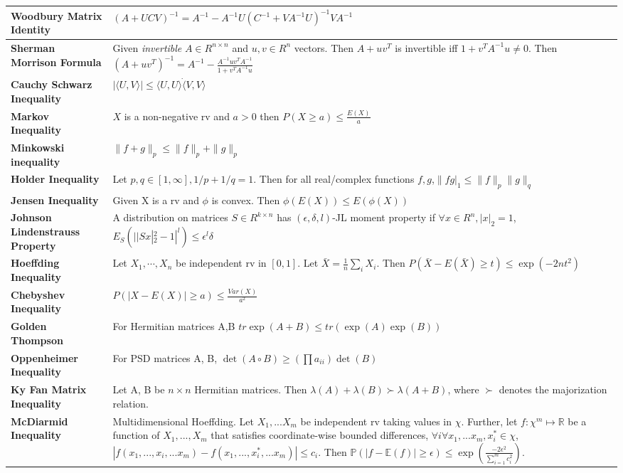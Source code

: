 \documentclass[11pt]{article}
\begin{document}
\begin{longtable}{|>{\raggedright}m{4.5cm}|m{13cm}|} \hline
\textbf{Woodbury Matrix Identity} & $(A+UCV)^{-1} = A^{-1} - A^{-1}U(C^{-1}+VA^{-1}U)^{-1}VA^{-1}$\\ \hline
\textbf{Sherman Morrison Formula} & Given \textit{invertible} $A \in R^{n\times n}$ and $u,v\in R^n$ vectors. Then $A+uv^T$ is invertible iff $1+v^TA^{-1}u \neq 0$. Then $(A+uv^T)^{-1} = A^{-1}-\frac{A^{-1}uv^TA^{-1}}{1+v^TA^{-1}u}$\\ \hline
\textbf{Cauchy Schwarz Inequality} & $ |\langle U, V \rangle| \leq \langle U, U\rangle \dot \langle V, V\rangle $\\ \hline
\textbf{Markov Inequality} & $X$ is a non-negative rv and $a>0$ then $P(X \geq a) \leq \frac{E(X)}{a}$\\ \hline
\textbf{Minkowski inequality} & $\|f+g\|_p \leq \|f\|_p + \| g\|_p$\\ \hline
\textbf{Holder Inequality} & Let $p,q\in [1, \infty], 1/p+1/q=1$. Then for all real/complex functions $f,g$,$\|fg|_1 \leq \|f\|_p\|g\|_q$\\ \hline
\textbf{Jensen Inequality} & Given X is a rv and $\phi$ is convex. Then $\phi(E(X)) \leq E(\phi(X))$\\ \hline
\textbf{Johnson Lindenstrauss Property} & A distribution on matrices $S\in R^{k \times n}$ has $(\epsilon, \delta, l)$-JL moment property if $\forall x\in R^n, |x|_2=1$, $E_S(||Sx|^2_2-1|^l)\leq \epsilon^l\delta$\\ \hline
\textbf{Hoeffding Inequality} & Let $X_1,\cdots,X_n$ be independent rv in $[0,1]$. Let $\bar{X} = \frac{1}{n}\sum_i{X_i}$. Then $P(\bar{X}-E(\bar{X})\geq t) \leq \exp(-2nt^2)$ \\ \hline
\textbf{Chebyshev Inequality} & $P(|X-E(X)| \geq a) \leq \frac{Var(X)}{a^2}$\\ \hline
\textbf{Golden Thompson} & For Hermitian matrices A,B $tr \exp(A+B) \leq tr(\exp(A)\exp(B))$\\ \hline
\textbf{Oppenheimer Inequality} & For PSD matrices A, B, $\det(A \circ B) \ge \left( \prod a_{ii} \right) \det(B)$\\ \hline
\textbf{Ky Fan Matrix Inequality} & Let A, B be $n \times n$ Hermitian matrices. Then $\lambda(A) + \lambda(B) \succ \lambda(A+B)$, where $\succ$ denotes the majorization relation.\\ \hline
\textbf{McDiarmid Inequality} & Multidimensional Hoeffding. Let $X_1,...X_m$ be independent rv taking values in $\chi$. Further, let $f: \chi^m \mapsto \mathbb{R}$ be a function of $X_1,...,X_m$ that satisfies coordinate-wise bounded differences, $\forall i \forall x_1,...x_m,x_i^* \in \chi$, $\left| f(x_1, ... , x_i, ... x_m) - f(x_1,...,x_i^*, ...x_m) \right| \leq c_i$. Then $\mathbb{P}(|f - \mathbb{E}(f)| \geq \epsilon) \leq \exp\left(  \frac{-2\epsilon^2}{\sum_{i=1}^{m}c_i^2} \right)$.\\ \hline

\end{longtable}
\end{document}
